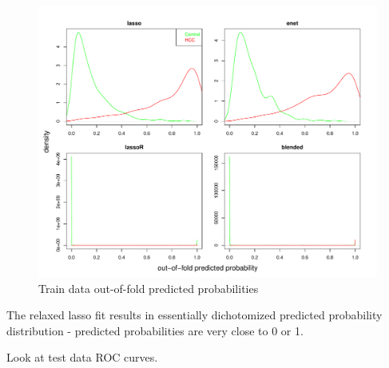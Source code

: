 \documentclass[
]{book}
\begin{document}
\begin{figure}
\centering
\includegraphics{Static/figures/trainOOFprops-1.pdf}
\caption{\label{fig:trainOOFprops}Train data out-of-fold predicted probabilities}
\end{figure}

The relaxed lasso fit results in essentially dichotomized predicted probability
distribution - predicted probabilities are very close to 0 or 1.

Look at test data ROC curves.
\end{document}
